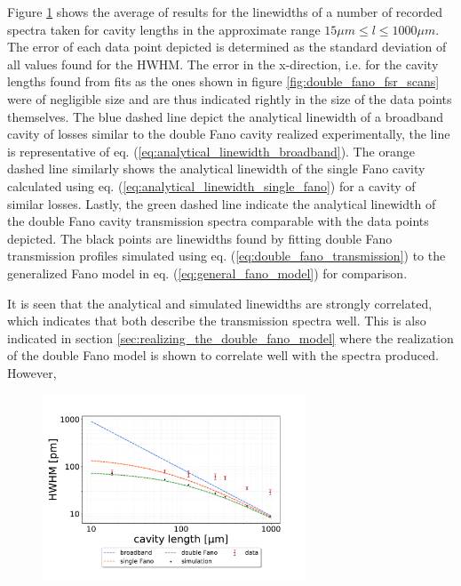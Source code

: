 Figure \ref{fig:HWHM_vs_l_double_fano_result} shows the average of results for the linewidths of a number of recorded spectra taken for cavity lengths in the approximate range $15 \mu m \leq l \leq 1000 \mu m$. The error of each data point depicted is determined as the standard deviation of all values found for the HWHM. The error in the x-direction, i.e. for the cavity lengths found from fits as the ones shown in figure \ref{fig:double_fano_fsr_scans} were of negligible size and are thus indicated rightly in the size of the data points themselves. The blue dashed line depict the analytical linewidth of a broadband cavity of losses similar to the double Fano cavity realized experimentally, the line is representative of eq. (\ref{eq:analytical_linewidth_broadband}). The orange dashed line similarly shows the analytical linewidth of the single Fano cavity calculated using eq. (\ref{eq:analytical_linewidth_single_fano}) for a cavity of similar losses. Lastly, the green dashed line indicate the analytical linewidth of the double Fano cavity transmission spectra comparable with the data points depicted. The black points are linewidths found by fitting double Fano transmission profiles simulated using eq. (\ref{eq:double_fano_transmission}) to the generalized Fano model in eq. (\ref{eq:general_fano_model}) for comparison.

It is seen that the analytical and simulated linewidths are strongly correlated, which indicates that both describe the transmission spectra well. This is also indicated in section \ref{sec:realizing_the_double_fano_model} where the realization of the double Fano model is shown to correlate well with the spectra produced. However,

\begin{figure}[h!]
    \centering
    \includegraphics[width=0.7\textwidth]{figures/results/double fano fits/HWHM_vs_cavity_length_result.pdf}
    \caption{}
    \label{fig:HWHM_vs_l_double_fano_result}
\end{figure}

